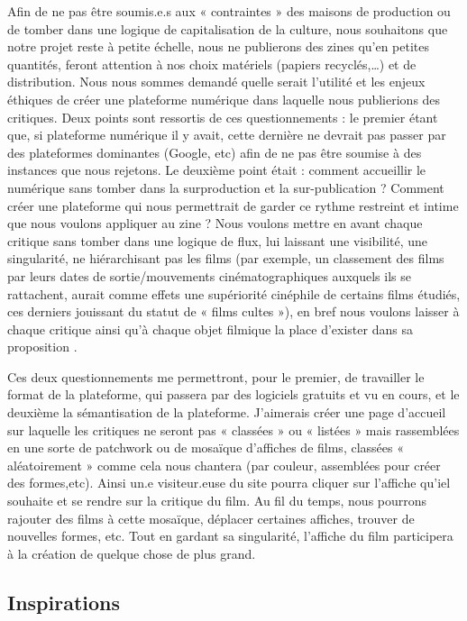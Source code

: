 \documentclass[12pt,french,letterpaper]{article}
\begin{document}
{Afin de ne pas être soumis.e.s aux « contraintes » des maisons de
production ou de tomber dans une logique de capitalisation de la
culture, nous souhaitons que notre projet reste à petite échelle, nous
ne publierons des zines qu'en petites quantités, feront attention à nos
choix matériels (papiers recyclés,\ldots) et de distribution. Nous nous
sommes demandé quelle serait l'utilité et les enjeux éthiques de créer
une plateforme numérique dans laquelle nous publierions des critiques.
Deux points sont ressortis de ces questionnements : le premier étant
que, si plateforme numérique il y avait, cette dernière ne devrait pas
passer par des plateformes dominantes (Google, etc) afin de ne pas être
soumise à des instances que nous rejetons. Le deuxième point était :
comment accueillir le numérique sans tomber dans la surproduction et la
sur-publication ? Comment créer une plateforme qui nous permettrait de
garder ce rythme restreint et intime que nous voulons appliquer au zine
? Nous voulons mettre en avant chaque critique sans tomber dans une
logique de flux, lui laissant une visibilité, une singularité, ne
hiérarchisant pas les films (par exemple, un classement des films par
leurs dates de sortie/mouvements cinématographiques auxquels ils se
rattachent, aurait comme effets une supériorité cinéphile de certains
films étudiés, ces derniers jouissant du statut de « films cultes »), en
bref nous voulons laisser à chaque critique ainsi qu'à chaque objet
filmique la place d'exister dans sa proposition .

Ces deux questionnements me permettront, pour le premier, de travailler
le format de la plateforme, qui passera par des logiciels gratuits et vu
en cours, et le deuxième la sémantisation de la plateforme. J'aimerais
créer une page d'accueil sur laquelle les critiques ne seront pas «
classées » ou « listées » mais rassemblées en une sorte de patchwork ou
de mosaïque d'affiches de films, classées « aléatoirement » comme cela
nous chantera (par couleur, assemblées pour créer des formes,etc). Ainsi
un.e visiteur.euse du site pourra cliquer sur l'affiche qu'iel souhaite
et se rendre sur la critique du film. Au fil du temps, nous pourrons
rajouter des films à cette mosaïque, déplacer certaines affiches,
trouver de nouvelles formes, etc. Tout en gardant sa singularité,
l'affiche du film participera à la création de quelque chose de plus
grand.

\hypertarget{inspirations}{%
\subsection{Inspirations}\label{inspirations}}

}
\end{document}
